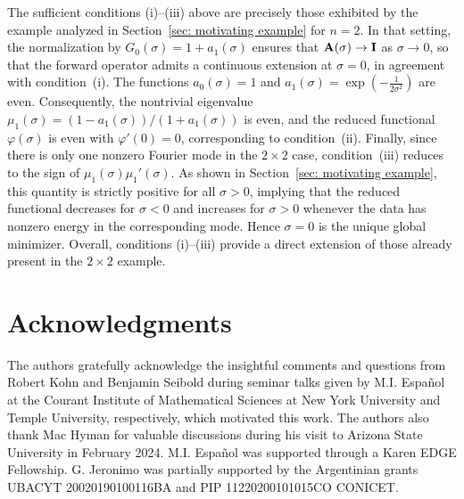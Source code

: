 \documentclass[onefignum,onetabnum]{siamart171218}
\newcommand{\bA}{{\bf A}}
\newcommand{\bI}{{\bf I}}
\begin{document}
The sufficient conditions (i)--(iii) above are precisely those exhibited by the
example analyzed in Section~\ref{sec: motivating example} for $n=2$.
In that setting, the normalization by $G_0(\sigma)=1+a_1(\sigma)$ ensures that
$\bA(\sigma)\to\bI$ as $\sigma\to0$, so that the forward operator admits a
continuous extension at $\sigma=0$, in agreement with condition~(i).
The functions $a_0(\sigma)=1$ and
$a_1(\sigma)=\exp\!\left(-\frac{1}{2\sigma^2}\right)$ are even.
Consequently, the nontrivial eigenvalue
$\mu_1(\sigma)=(1-a_1(\sigma))/(1+a_1(\sigma))$
is even, and the reduced functional $\varphi(\sigma)$ is even with
$\varphi'(0)=0$, corresponding to condition~(ii).
Finally, since there is only one nonzero Fourier mode in the $2\times2$ case,
condition~(iii) reduces to the sign of $\mu_1(\sigma)\mu_1'(\sigma)$.
As shown in Section~\ref{sec: motivating example}, this quantity is strictly
positive for all $\sigma>0$, implying that the reduced functional decreases for
$\sigma<0$ and increases for $\sigma>0$ whenever the data has nonzero energy in
the corresponding mode. Hence $\sigma=0$ is the unique global minimizer.
Overall, conditions (i)--(iii) provide a direct extension of those already present
in the $2\times2$ example.

\section*{Acknowledgments} The authors gratefully acknowledge the insightful comments and questions from Robert Kohn and Benjamin Seibold during seminar talks given by M.I. Espa\~nol at the Courant Institute of Mathematical Sciences at New York University and Temple University, respectively, which motivated this work. The authors also thank Mac Hyman for valuable discussions during his visit to Arizona State University in February 2024. M.I. Espa\~nol was supported through a Karen EDGE Fellowship. G. Jeronimo was partially supported by the Argentinian grants UBACYT 20020190100116BA and PIP 11220200101015CO CONICET. 

\end{document}
